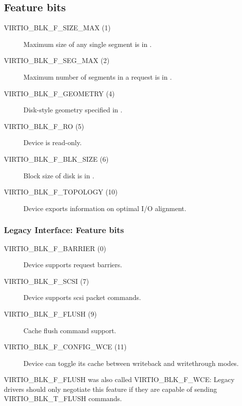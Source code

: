\subsection{Feature bits}\label{sec:Device Types / Block Device / Feature bits}

\begin{description}
\item[VIRTIO_BLK_F_SIZE_MAX (1)] Maximum size of any single segment is
    in .

\item[VIRTIO_BLK_F_SEG_MAX (2)] Maximum number of segments in a
    request is in .

\item[VIRTIO_BLK_F_GEOMETRY (4)] Disk-style geometry specified in
    .

\item[VIRTIO_BLK_F_RO (5)] Device is read-only.

\item[VIRTIO_BLK_F_BLK_SIZE (6)] Block size of disk is in .

\item[VIRTIO_BLK_F_TOPOLOGY (10)] Device exports information on optimal I/O
    alignment.
\end{description}

\subsubsection{Legacy Interface: Feature bits}\label{sec:Device Types / Block Device / Feature bits / Legacy Interface: Feature bits}

\begin{description}
\item[VIRTIO_BLK_F_BARRIER (0)] Device supports request barriers.

\item[VIRTIO_BLK_F_SCSI (7)] Device supports scsi packet commands.

\item[VIRTIO_BLK_F_FLUSH (9)] Cache flush command support.

\item[VIRTIO_BLK_F_CONFIG_WCE (11)] Device can toggle its cache between writeback
    and writethrough modes.
\end{description}

VIRTIO_BLK_F_FLUSH was also called VIRTIO_BLK_F_WCE: Legacy drivers
should only negotiate this feature if they are capable of sending
VIRTIO_BLK_T_FLUSH commands.


